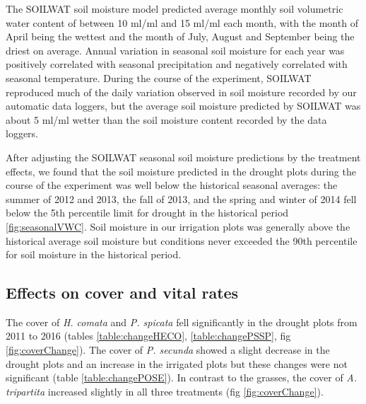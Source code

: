 \documentclass[11pt]{article}
\begin{document}
\begin{doublespacing}
The SOILWAT soil moisture model predicted average monthly soil volumetric water content of between 10 ml/ml and 15 ml/ml each month, with the month of April being the wettest and the month of July, August and September being the driest on average. Annual variation in seasonal soil moisture for each year was positively correlated with seasonal precipitation and negatively correlated with seasonal temperature. During the course of the experiment, SOILWAT reproduced much of the daily variation observed in soil moisture recorded by our automatic data loggers, but the average soil moisture predicted by SOILWAT was about 5 ml/ml wetter than the soil moisture content recorded by the data loggers.  

After adjusting the SOILWAT seasonal soil moisture predictions by the treatment effects, we found that the soil moisture predicted in the drought plots during the course of the experiment was well below the historical seasonal averages: the summer of 2012 and 2013, the fall of 2013, and the spring and winter of 2014 fell below the 5th percentile limit for drought in the historical period \ref{fig:seasonalVWC}. Soil moisture in our irrigation plots was generally above the historical average soil moisture but conditions never exceeded the 90th percentile for soil moisture in the historical period. 

\subsection*{Effects on cover and vital rates}

The cover of \textit{H. comata} and \textit{P. spicata} fell significantly in the drought plots from 2011 to 2016 (tables \ref{table:changeHECO}, \ref{table:changePSSP}, fig \ref{fig:coverChange}). The cover of \textit{P. secunda} showed a slight decrease in the drought plots and an increase in the irrigated plots but these changes were not significant (table \ref{table:changePOSE}).  In contrast to the grasses, the cover of \textit{A. tripartita} increased slightly in all three treatments (fig \ref{fig:coverChange}). 


\end{doublespacing}
\end{document}
